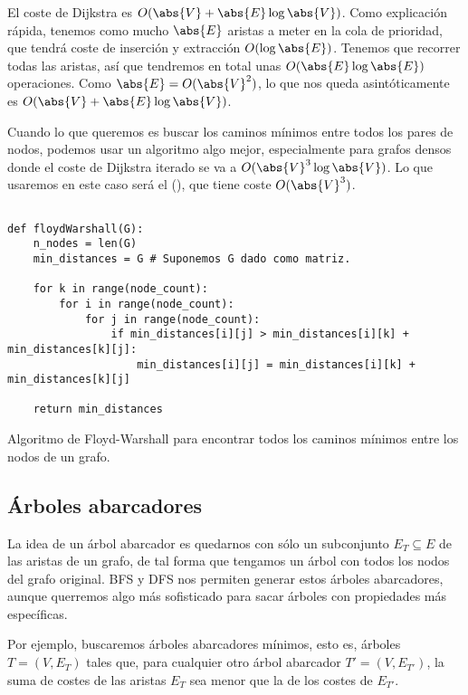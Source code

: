 \documentclass[palatino, nochap]{apuntes}
\begin{document}
El coste de Dijkstra es $O(\abs{V} + \abs{E} \log \abs{V})$. Como explicación rápida, tenemos como mucho $\abs{E}$ aristas a meter en la cola de prioridad, que tendrá coste de inserción y extracción $O(\log \abs{E})$. Tenemos que recorrer todas las aristas, así que tendremos en total unas $O(\abs{E} \log \abs{E})$ operaciones. Como $\abs{E} = O(\abs{V}^2)$, lo que nos queda asintóticamente es $O(\abs{V} + \abs{E}\log \abs{V})$.

Cuando lo que queremos es buscar los caminos mínimos entre todos los pares de nodos, podemos usar un algoritmo algo mejor, especialmente para grafos densos donde el coste de Dijkstra iterado se va a $O(\abs{V}^3 \log \abs{V})$. Lo que usaremos en este caso será el  (), que tiene coste $O(\abs{V}^3)$.

\begin{listing}[hbtp]
\begin{verbatim}

def floydWarshall(G):
	n_nodes = len(G)
	min_distances = G # Suponemos G dado como matriz.

	for k in range(node_count):
		for i in range(node_count):
			for j in range(node_count):
				if min_distances[i][j] > min_distances[i][k] + min_distances[k][j]:
					min_distances[i][j] = min_distances[i][k] + min_distances[k][j]

	return min_distances
\end{verbatim}
\caption{Algoritmo de Floyd-Warshall para encontrar todos los caminos mínimos entre los nodos de un grafo.}
\label{lst:FloydWarshall}
\end{listing}

\subsection{Árboles abarcadores}

La idea de un árbol abarcador es quedarnos con sólo un subconjunto $E_T ⊆ E$ de las aristas de un grafo, de tal forma que tengamos un árbol con todos los nodos del grafo original. BFS y DFS nos permiten generar estos árboles abarcadores, aunque querremos algo más sofisticado para sacar árboles con propiedades más específicas.

Por ejemplo, buscaremos árboles abarcadores mínimos, esto es, árboles $T = (V, E_T)$ tales que, para cualquier otro árbol abarcador $T' = (V, E_{T'})$, la suma de costes de las aristas $E_T$ sea menor que la de los costes de $E_{T'}$.
\end{document}
